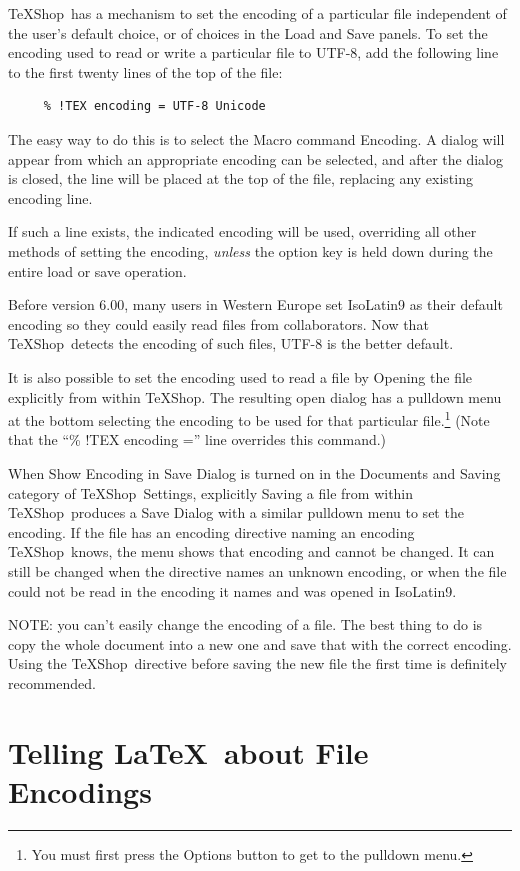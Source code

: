 \documentclass[letterpaper,11pt]{article}
\newcommand{\TS}{\textsf{\TeX Shop}}
\newcommand{\acr}[1]{\textsf{#1}}
\newcommand{\cmd}[1]{\textsf{#1}}
\begin{document}
\TS\ has a mechanism to set the encoding of a particular file independent of the user's default choice, or of choices in the Load and Save panels. To set the encoding used to read or write a particular file to \acr{UTF-8}, add the following line to the first twenty lines of the top of the file:
\begin{verbatim}
     % !TEX encoding = UTF-8 Unicode
\end{verbatim}
The easy way to do this is to select the Macro command \cmd{Encoding}. A dialog will appear from which an appropriate encoding can be selected, and after the dialog is closed, the line will be placed at the top of the file, replacing any existing encoding line.

If such a line exists, the indicated encoding will be used, overriding all other methods
of setting the encoding, \emph{unless} the option key is held down during the entire
load or save operation. 

Before version 6.00, many users in Western Europe set \acr{IsoLatin9} as their default encoding so they
could easily read files from collaborators. Now that \TS\ detects the encoding of such files, \acr{UTF-8} is the better default.

It is also possible to set the encoding used to read a file by Opening the file explicitly from within \TS. The resulting open dialog has a pulldown menu at the bottom selecting
the encoding to be used for that particular file.\footnote{You must first press the \cmd{Options} button to get to the pulldown menu.} (Note that the ``\acr{\% !TEX encoding =}''
line overrides this command.)

When \cmd{Show Encoding in Save Dialog} is turned on in the \cmd{Documents and Saving} category of \TS\ Settings, explicitly Saving a file from within \TS\ produces a Save Dialog with a similar pulldown menu to set the encoding. If the file has an encoding directive naming an encoding \TS\ knows, the menu shows that encoding and cannot be changed. It can still be changed when the directive names an unknown encoding, or when the file could not be read in the encoding it names and was opened in \acr{IsoLatin9}.

NOTE: you can't easily change the encoding of a file. The best thing to do is copy the whole document into a new one and save that with the correct encoding. Using the \TS\ directive before saving the new file the first time is definitely recommended.

\section{Telling \LaTeX\ about File Encodings}
\end{document}
